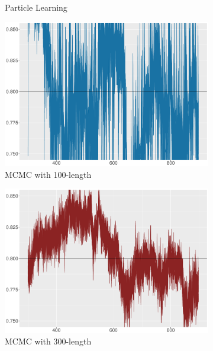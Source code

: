 \begin{figure}[h]
\begin{subfigure}[t]{0.46\textwidth}
\caption{Particle Learning}
  \end{subfigure}
    \begin{subfigure}[t]{0.46\textwidth}
\includegraphics[width=\textwidth]{Chapters/04Filtering/plot/MCMCchain100.pdf}
  \caption{MCMC with 100-length}
    \end{subfigure}
   \begin{subfigure}[t]{0.46\textwidth}
\includegraphics[width=\textwidth]{Chapters/04Filtering/plot/MCMCchain300.pdf}
 \caption{MCMC with 300-length}
   \end{subfigure}
   \begin{subfigure}[t]{0.46\textwidth}

\end{subfigure}
\end{figure}
